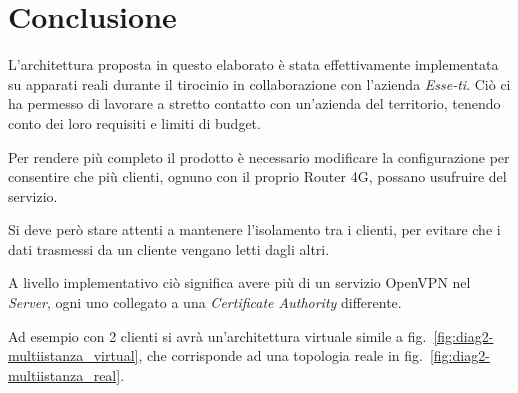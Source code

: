 \chapter{Conclusione \workinprogress}

L'architettura proposta in questo elaborato è stata effettivamente implementata su apparati reali durante il tirocinio in collaborazione con l'azienda \textit{Esse-ti}. Ciò ci ha permesso di lavorare a stretto contatto con un'azienda del territorio, tenendo conto dei loro requisiti e limiti di budget.

\todo[da riscrivere]
Per rendere più completo il prodotto è necessario modificare la configurazione per consentire che più clienti, ognuno con il proprio Router 4G, possano usufruire del servizio. 


Si deve però stare attenti a mantenere l'isolamento tra i clienti, per evitare che i dati trasmessi da un cliente vengano letti dagli altri.



A livello implementativo ciò significa avere più di un servizio OpenVPN nel \textit{Server}, ogni uno collegato a una \textit{Certificate Authority} differente.

Ad esempio con 2 clienti si avrà un'architettura virtuale simile a fig.~\ref{fig:diag2-multiistanza_virtual}, che corrisponde ad una topologia reale in fig.~\ref{fig:diag2-multiistanza_real}.

